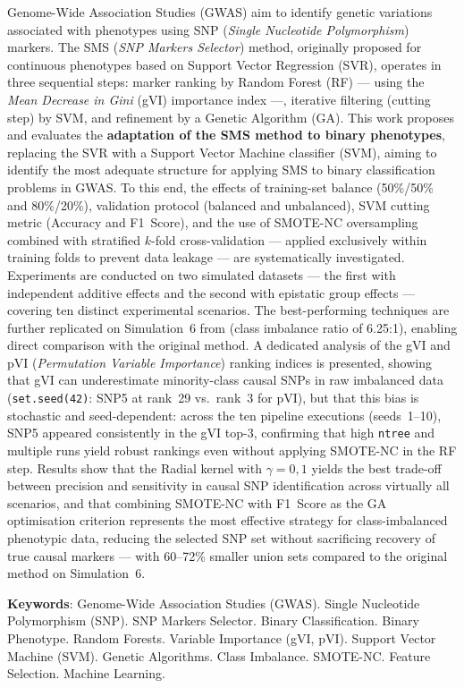 \documentclass[
    12pt,
    a4paper,
    oneside,
    english,
    french,
    spanish,
    brazil
    ]{abntex2}
\begin{document}
\begin{SingleSpace}
\noindent
Genome-Wide Association Studies (GWAS) aim to identify genetic variations
associated with phenotypes using SNP (\textit{Single Nucleotide Polymorphism})
markers. The SMS (\textit{SNP Markers Selector}) method, originally proposed for
continuous phenotypes based on Support Vector Regression (SVR), operates in three
sequential steps: marker ranking by Random Forest (RF) --- using the
\textit{Mean Decrease in Gini} (gVI) importance index ---, iterative filtering
(cutting step) by SVM, and refinement by a Genetic Algorithm (GA). This work
proposes and evaluates the \textbf{adaptation of the SMS method to binary
phenotypes}, replacing the SVR with a Support Vector Machine classifier (SVM),
aiming to identify the most adequate structure for applying SMS to binary
classification problems in GWAS. To this end, the effects of training-set balance
(50\%/50\% and 80\%/20\%), validation protocol (balanced and unbalanced),
SVM cutting metric (Accuracy and F1~Score), and the use of SMOTE-NC oversampling
combined with stratified $k$-fold cross-validation --- applied exclusively within
training folds to prevent data leakage --- are systematically investigated.
Experiments are conducted on two simulated datasets --- the first with independent
additive effects and the second with epistatic group effects --- covering ten
distinct experimental scenarios. The best-performing techniques are further
replicated on Simulation~6 from  (class imbalance ratio
of 6.25:1), enabling direct comparison with the original method. A dedicated
analysis of the gVI and pVI (\textit{Permutation Variable Importance}) ranking
indices is presented, showing that gVI can underestimate minority-class causal SNPs
in raw imbalanced data (\texttt{set.seed(42)}: SNP5 at rank~29 vs.\ rank~3 for pVI),
but that this bias is stochastic and seed-dependent: across the ten pipeline
executions (seeds~1--10), SNP5 appeared consistently in the gVI top-3, confirming
that high \texttt{ntree} and multiple runs yield robust rankings even without
applying SMOTE-NC in the RF step. Results show that the Radial kernel
with $\gamma = 0{,}1$ yields the best trade-off between precision and sensitivity
in causal SNP identification across virtually all scenarios, and that combining
SMOTE-NC with F1~Score as the GA optimisation criterion represents the most
effective strategy for class-imbalanced phenotypic data, reducing the selected SNP
set without sacrificing recovery of true causal markers --- with 60--72\% smaller
union sets compared to the original method on Simulation~6.

\noindent\textbf{Keywords}: Genome-Wide Association Studies (GWAS).
Single Nucleotide Polymorphism (SNP).
SNP Markers Selector.
Binary Classification.
Binary Phenotype.
Random Forests.
Variable Importance (gVI, pVI).
Support Vector Machine (SVM).
Genetic Algorithms.
Class Imbalance.
SMOTE-NC.
Feature Selection.
Machine Learning.
\end{SingleSpace}
\end{document}
